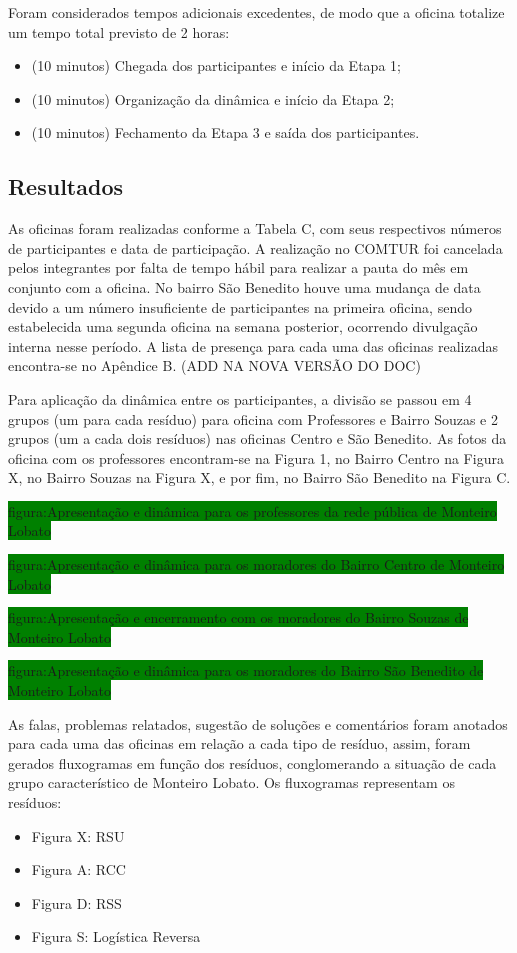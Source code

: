 	Foram considerados tempos adicionais excedentes, de modo que a oficina totalize um tempo total previsto de 2 horas:
	\begin{itemize}
		\item (10 minutos) Chegada dos participantes e início da Etapa 1;
		\item (10 minutos) Organização da dinâmica e início da Etapa 2;
		\item (10 minutos) Fechamento da Etapa 3 e saída dos participantes.
	\end{itemize}
	
	
	
	\subsection{Resultados}
	As oficinas foram realizadas conforme a Tabela C, com seus respectivos números de participantes e data de participação. A realização no COMTUR foi cancelada pelos integrantes por falta de tempo hábil para realizar a pauta do mês em conjunto com a oficina. No bairro São Benedito houve uma mudança de data devido a um número insuficiente de participantes na primeira oficina, sendo estabelecida uma segunda oficina na semana posterior, ocorrendo divulgação interna nesse período. A lista de presença para cada uma das oficinas realizadas encontra-se no Apêndice B. (ADD NA NOVA VERSÃO DO DOC)
	
	Para aplicação da dinâmica entre os participantes, a divisão se passou em 4 grupos (um para cada resíduo) para oficina com Professores e Bairro Souzas e 2 grupos (um a cada dois resíduos) nas oficinas Centro e São Benedito. As fotos da oficina com os professores encontram-se na Figura 1, no Bairro Centro na Figura X, no Bairro Souzas na Figura X, e por fim, no Bairro São Benedito na Figura C.
	
	\colorbox{green}{figura:Apresentação e dinâmica para os professores da rede pública de Monteiro Lobato}
	
	\colorbox{green}{figura:Apresentação e dinâmica para os moradores do Bairro Centro de Monteiro Lobato}
	
	\colorbox{green}{figura:Apresentação e encerramento com os moradores do Bairro Souzas de Monteiro Lobato}
	
	\colorbox{green}{figura:Apresentação e dinâmica para os moradores do Bairro São Benedito de Monteiro Lobato}
	
	As falas, problemas relatados, sugestão de soluções e comentários foram anotados para cada uma das oficinas em relação a cada tipo de resíduo, assim, foram gerados fluxogramas em função dos resíduos, conglomerando a situação de cada grupo característico de Monteiro Lobato. Os fluxogramas representam os resíduos:
	\begin{itemize}
	\item Figura X: RSU
	\item Figura A: RCC
	\item Figura D: RSS
	\item Figura S: Logística Reversa 
	\end{itemize}
	
